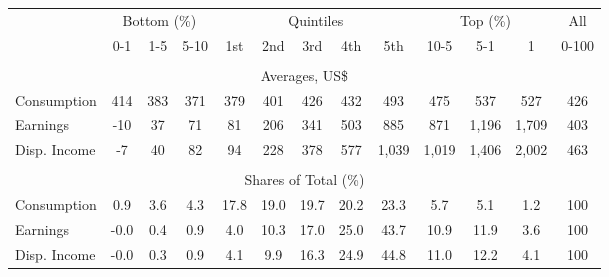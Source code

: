 \begin{tabular}{l c c c| c c c c c| c c c| c}
\toprule
&\multicolumn{3}{c|}{Bottom (\%)} & \multicolumn{5}{c|}{Quintiles} & \multicolumn{3}{c|}{Top (\%)} & All  \\
& 0-1 & 1-5 & 5-10 &  1st & 2nd & 3rd & 4th & 5th & 10-5 & 5-1 & 1 & 0-100 \\
\midrule \\
\multicolumn{13}{c}{Averages, US\$} \\
\midrule
Consumption  & 414  & 383  & 371  & 379  & 401  & 426  & 432  & 493  & 475  & 537  & 527  & 426 \\
Earnings         & -10 & 37 & 71 & 81 & 206 & 341 & 503 & 885 & 871 & 1,196 & 1,709 & 403 \\
Disp. Income & -7 & 40 & 82 & 94 & 228 & 378 & 577 & 1,039 & 1,019 & 1,406 & 2,002 & 463 \\
\midrule \\
\multicolumn{13}{c}{Shares of Total (\%)} \\
\midrule
Consumption  & 0.9   & 3.6   & 4.3   & 17.8   & 19.0   & 19.7   & 20.2   & 23.3   & 5.7   & 5.1   & 1.2   & 100 \\
Earnings         & -0.0  & 0.4  & 0.9  & 4.0  & 10.3  & 17.0  & 25.0  & 43.7  & 10.9  & 11.9  & 3.6  & 100 \\
Disp. Income & -0.0  & 0.3  & 0.9  & 4.1  & 9.9  & 16.3  & 24.9  & 44.8  & 11.0  & 12.2  & 4.1  & 100 \\
\bottomrule
\end{tabular}